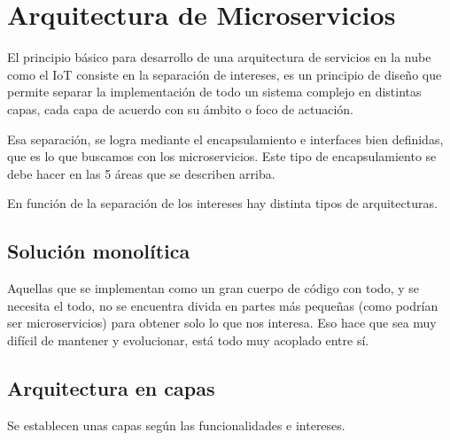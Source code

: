 \documentclass[12pt]{report} %
\begin{document}
\section{Arquitectura de Microservicios}

El principio básico para desarrollo de una arquitectura de servicios en la nube como el IoT consiste en la separación de intereses, es un principio de diseño que permite separar la implementación de todo un sistema complejo en distintas capas, cada capa de acuerdo con su ámbito o foco de actuación. 

Esa separación, se logra mediante el encapsulamiento e interfaces bien definidas, que es lo que buscamos con los microservicios.
Este tipo de encapsulamiento se debe hacer en las 5 áreas que se describen arriba.

En función de la separación de los intereses hay distinta tipos de arquitecturas.

\subsection{Solución monolítica} 
Aquellas que se implementan como un gran cuerpo de código con todo,  y se necesita el todo, no se encuentra divida en partes más pequeñas (como podrían ser microservicios) para obtener solo lo que nos interesa. Eso hace que sea muy difícil de mantener y evolucionar, está todo muy acoplado entre sí.

\subsection{Arquitectura en capas}
Se establecen unas capas según las funcionalidades e intereses.
\end{document}
